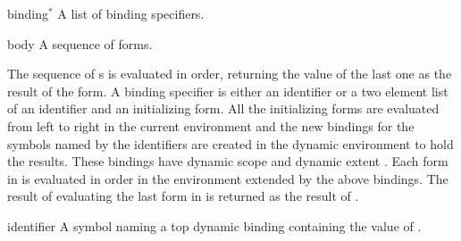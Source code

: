 \begin{optDefinition}
%
\Syntax
{}%
%
\begin{arguments}
    \item[binding\/$^*$] A list of binding specifiers.

    \item[body] A sequence of forms.
\end{arguments}
%
\result%
The sequence of s is evaluated in order, returning the value of the
last one as the result of the  form.
%
\remarks%
A binding specifier is either an identifier or a two element list of an
identifier and an initializing form.  All the initializing forms are evaluated
from left to right in the current environment and the new bindings for the
symbols named by the identifiers are created in the dynamic environment to hold
the results.  These bindings have dynamic scope and dynamic extent
.  Each
form in  is evaluated in order in the environment extended by the
above bindings.  The result of evaluating the last form in  is
returned as the result of .

%
\Syntax
{}%
%
\begin{arguments}
    \item[identifier] A symbol naming a top dynamic binding containing the value
    of .


\end{arguments}
\end{optDefinition}
